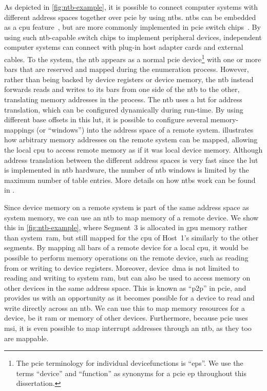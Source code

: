As depicted in \cref{fig:ntb-example}, it is possible to connect computer systems with different address spaces together over \gls{pcie} by using \glspl{ntb}.
%
\Glspl{ntb} can be embedded as a \gls{cpu} feature~\cite{whitepaper:Sullivan2010,url:LinuxNTB-AMD}, but are more commonly implemented in \gls{pcie} switch chips~\cite{whitepaper:PLX,pex8733}.
%
By using such \gls{ntb}-capable switch chips to implement peripheral devices, independent computer systems can connect with plug-in host adapter cards and external cables.
%
To the system, the \gls{ntb} appears as a normal \gls{pcie} device\footnote{The \gls{pcie} terminology for individual \glspl{devicefunction} is ``\glspl{ep}''. We use the terms ``device'' and ``\gls{function}'' as synonyms for a \gls{pcie} \gls{ep} throughout this dissertation.} with one or more \glspl{bar} that are reserved and mapped during the enumeration process.
%
However, rather than being backed by device registers or device memory, the \gls{ntb} instead forwards reads and writes to its \glspl{bar} from one side of the \gls{ntb} to the other, translating memory addresses in the process.
%
The \gls{ntb} uses a \gls{lut} for address translation, which can be configured dynamically during run-time.
%
By using different base offsets in this \gls{lut}, it is possible to configure several memory-mappings (or ``windows'') into the address space of a remote system.
%
 illustrates how arbitrary memory addresses on the remote system can be mapped, allowing the local \gls{cpu} to access remote memory as if it was local device memory.
%
Although address translation between the different address spaces is very fast since the \gls{lut} is implemented in \gls{ntb} hardware, the number of \gls{ntb} windows is limited by the maximum number of table entries.
%
More details on how \glspl{ntb} work can be found in .



Since device memory on a remote system is part of the same address space as system memory, we can use an \gls{ntb} to map memory of a remote device.
%
We show this in \cref{fig:ntb-example}, where Segment~3 is allocated in \gls{gpu} memory rather than system~\gls{ram}, but still mapped for the \gls{cpu} of Host~1's similarly to the other segments.
%
By mapping all \glspl{bar} of a remote device for a local \gls{cpu}, it would be possible to perform memory operations on the remote device, such as reading from or writing to device registers.
%
Moreover, device~\gls{dma} is not limited to reading and writing to system \gls{ram}, but can also be used to access memory on other devices in the same address space.
%
This is known as ``\gls{p2p}'' in \gls{pcie}, and provides us with an opportunity as it becomes possible for a device to read and write directly across an \gls{ntb}.
%
We can use this to map memory resources for a device, be it \gls{ram} or memory of other devices. 
%
Furthermore, because \gls{pcie} uses \gls{msi}, it is even possible to map interrupt addresses through an \gls{ntb}, as they too are mappable.



